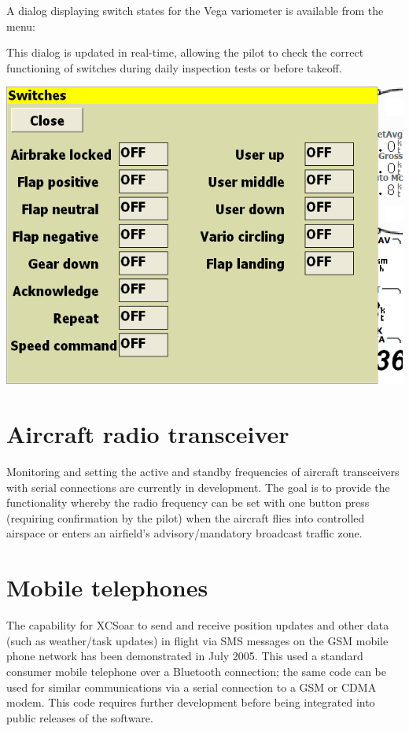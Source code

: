 \documentclass[a4paper,12pt]{refrep}
\begin{document}
A dialog displaying switch states for the Vega variometer
is available from the menu:
\begin{quote}
\blink{}\blink{}
\end{quote}

This dialog is updated in real-time, allowing the pilot
to check the correct functioning of switches during daily
inspection tests or before takeoff. 

\begin{center}
\includegraphics[angle=0,width=\linewidth,keepaspectratio='true']{figures/dialog-switches.png}
\end{center}

\section{Aircraft radio transceiver}

Monitoring and setting the active and standby frequencies of aircraft
transceivers with serial connections are currently in development.
The goal is to provide the functionality whereby the radio frequency
can be set with one button press (requiring confirmation by the pilot)
when the aircraft flies into controlled airspace or enters an
airfield's advisory/mandatory broadcast traffic zone.

\section{Mobile telephones}

The capability for XCSoar to send and receive position updates and
other data (such as weather/task updates) in flight via SMS messages
on the GSM mobile phone network has been demonstrated in July 2005.
This used a standard consumer mobile telephone over a Bluetooth
connection; the same code can be used for similar communications via a
serial connection to a GSM or CDMA modem.  This code requires further
development before being integrated into public releases of the
software.
\end{document}
